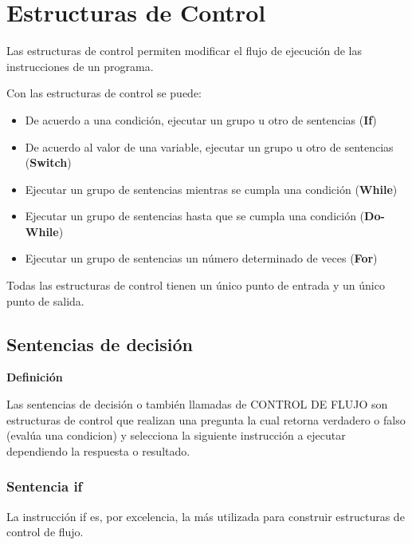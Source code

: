 \section{Estructuras de Control}

Las estructuras de control permiten modificar el flujo de ejecución de las instrucciones de un programa.

Con las estructuras de control se puede:

\begin{itemize}
\item De acuerdo a una condición, ejecutar un grupo u otro de sentencias (\textbf{If})
\item De acuerdo al valor de una variable, ejecutar un grupo u otro de sentencias (\textbf{Switch})
\item Ejecutar un grupo de sentencias mientras se cumpla una condición (\textbf{While})
\item Ejecutar un grupo de sentencias hasta que se cumpla una condición (\textbf{Do-While})
\item Ejecutar un grupo de sentencias un número determinado de veces (\textbf{For})
\end{itemize}

Todas las estructuras de control tienen un único punto de entrada y un único punto de salida.


\subsection{Sentencias de decisión}

\begin{center}
	\textbf{Definición}
\end{center}

Las sentencias de decisión o también llamadas de CONTROL DE FLUJO son estructuras de control que realizan una pregunta la cual retorna verdadero o falso (evalúa una condicion) y selecciona la siguiente instrucción a ejecutar dependiendo la respuesta o resultado.


\subsubsection{Sentencia if}

La instrucción if es, por excelencia, la más utilizada para construir estructuras de control de flujo.

